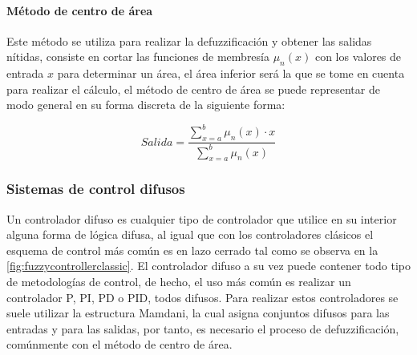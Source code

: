             \paragraph{Método de centro de área}

                Este método se utiliza para realizar la defuzzificación y obtener las salidas nítidas, consiste en cortar las funciones de membresía $\mu_{n}(x)$ con los valores de entrada $x$ para determinar un área, el área inferior será la que se tome en cuenta para realizar el cálculo, el método de centro de área se puede representar de modo general en su forma discreta de la siguiente forma:
                
                \begin{equation}\label{eq:Centroide}
                    Salida = \frac{\displaystyle\sum\limits_{x=a}^{b}\mu_{n}(x)\cdot x}{\displaystyle\sum\limits_{x=a}^{b}\mu_{n}(x)}
                \end{equation}
    
        \subsubsection{Sistemas de control difusos}
            
            Un controlador difuso es cualquier tipo de controlador que utilice en su interior alguna forma de lógica difusa, al igual que con los controladores clásicos el esquema de control más común es en lazo cerrado tal como se observa en la \cref{fig:fuzzycontrollerclassic}. El controlador difuso a su vez puede contener todo tipo de metodologías de control, de hecho, el uso más común es realizar un controlador P, PI, PD o PID, todos difusos. Para realizar estos controladores se suele utilizar la estructura Mamdani, la cual asigna conjuntos difusos para las entradas y para las salidas, por tanto, es necesario el proceso de defuzzificación, comúnmente con el método de centro de área.
                    
